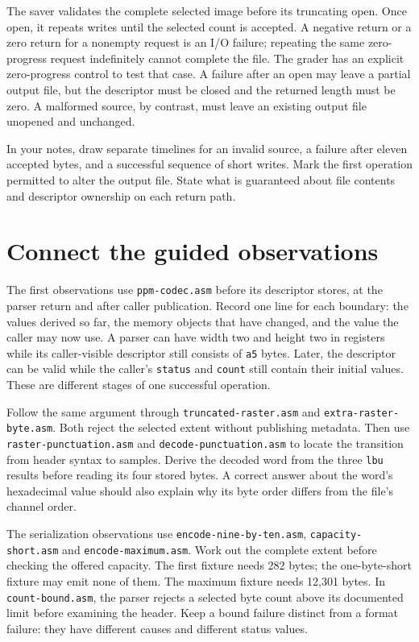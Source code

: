 The saver validates the complete selected image before its truncating open.
Once open, it repeats writes until the selected count is accepted. A negative
return or a zero return for a nonempty request is an I/O failure; repeating the
same zero-progress request indefinitely cannot complete the file. The grader
has an explicit zero-progress control to test that case. A failure after an
open may leave a partial output file, but the descriptor must be closed and
the returned length must be zero. A malformed source, by contrast, must leave
an existing output file unopened and unchanged.

In your notes, draw separate timelines for an invalid source, a failure after
eleven accepted bytes, and a successful sequence of short writes. Mark the
first operation permitted to alter the output file. State what is guaranteed
about file contents and descriptor ownership on each return path.

\section{Connect the guided observations}

The first observations use \texttt{ppm-codec.asm} before its descriptor stores,
at the parser return and after caller publication. Record one line for each
boundary: the values derived so far, the memory objects that have changed,
and the value the caller may now use. A parser can have width two and height
two in registers while its caller-visible descriptor still consists of
\texttt{a5} bytes. Later, the descriptor can be valid while the caller's
\texttt{status} and \texttt{count} still contain their initial values. These
are different stages of one successful operation.

Follow the same argument through \texttt{truncated-raster.asm} and
\texttt{extra-raster-byte.asm}. Both reject the selected extent without
publishing metadata. Then use \texttt{raster-punctuation.asm} and
\texttt{decode-punctuation.asm} to locate the transition from header syntax
to samples. Derive the decoded word from the three \texttt{lbu} results before
reading its four stored bytes. A correct answer about the word's hexadecimal
value should also explain why its byte order differs from the file's channel
order.

The serialization observations use \texttt{encode-nine-by-ten.asm},
\texttt{capacity-short.asm} and \texttt{encode-maximum.asm}. Work out the
complete extent before checking the offered capacity. The first fixture
needs 282 bytes; the one-byte-short fixture may emit none of them. The
maximum fixture needs 12,301 bytes. In \texttt{count-bound.asm}, the parser
rejects a selected byte count above its documented limit before examining the
header. Keep a bound failure distinct from a format failure: they have
different causes and different status values.

